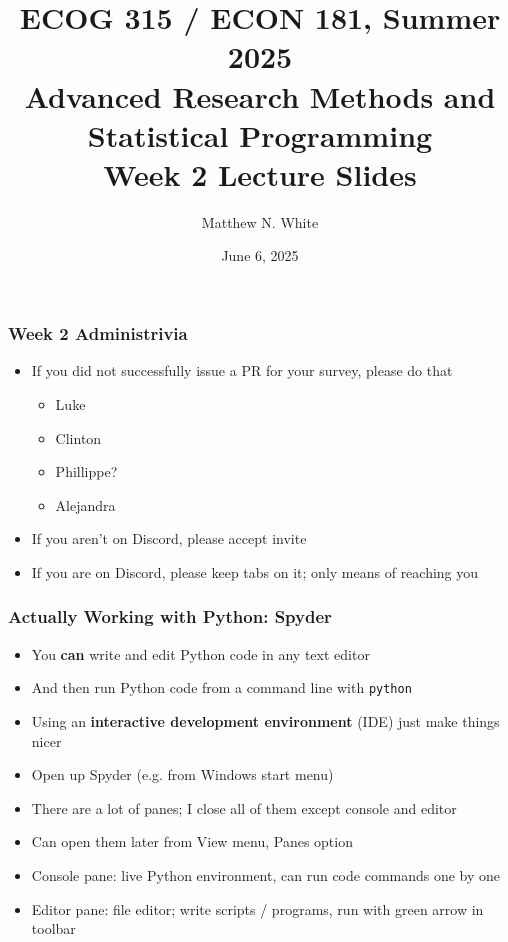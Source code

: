 \documentclass[aspectratio=169, handout]{beamer}
\author{Matthew N. White}
\title[add]{ECOG 315 / ECON 181, Summer 2025 \\ Advanced Research Methods and Statistical Programming \\ Week 2 Lecture Slides}
\institute[HU]{Howard University}
\date{June 6, 2025}
\begin{document}
\begin{frame}
\maketitle
\end{frame}


\begin{frame}
\frametitle{Week 2 Administrivia}
	
\begin{itemize}
\item If you did not successfully issue a PR for your survey, please do that
\begin{itemize}
	\item Luke
		
	\item Clinton
		
	\item Phillippe?
		
	\item Alejandra
\end{itemize}

\item If you aren't on Discord, please accept invite

\item If you are on Discord, please keep tabs on it; only means of reaching you
\end{itemize}
	
\end{frame}


\begin{frame}
\frametitle{Actually Working with Python: Spyder}
\begin{itemize}
	\item You \textbf{can} write and edit Python code in any text editor
	
	\item And then run Python code from a command line with \texttt{python}
	
	\item <2->Using an \textbf{interactive development environment} (IDE) just make things nicer
	
	\item <2->Open up Spyder (e.g. from Windows start menu)
	
	\item <3->There are a lot of panes; I close all of them except console and editor
	
	\item <3->Can open them later from View menu, Panes option
	
	\item <4->Console pane: live Python environment, can run code commands one by one
	
	\item <4->Editor pane: file editor; write scripts / programs, run with green arrow in toolbar
\end{itemize}
\end{frame}
\end{document}
